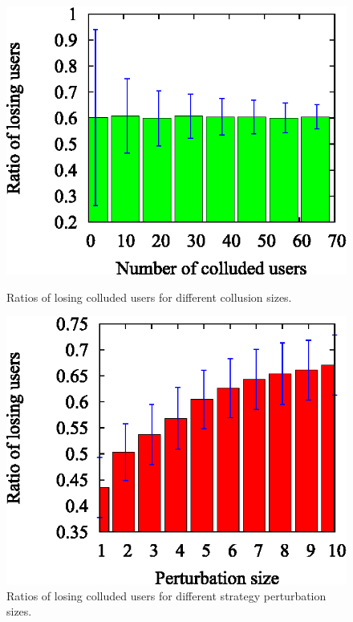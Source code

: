\documentclass[conference]{IEEEtran}
\theoremstyle{definition}
\begin{document}
\begin{figure}[!t]
\centering
\begin{minipage}{0.3\textwidth}
\includegraphics[width=\textwidth]{collusion_resist_codes/images/img_gs_ratio_dis.eps}
\caption{Ratios of losing colluded users for different collusion sizes.}
\label{fig:gs_ratio_dis}
\end{minipage}
\hspace{0.01cm}
\begin{minipage}{0.3\textwidth}
\includegraphics[width=\textwidth]{collusion_resist_codes/images/img_gs_perturb_dis.eps}
\caption{Ratios of losing colluded users for different strategy perturbation sizes.}

\end{minipage}
\end{figure}
\end{document}
